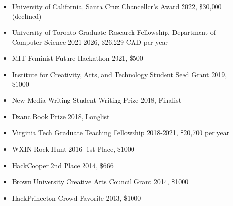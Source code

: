 \begin{itemize}
\item University of California, Santa Cruz Chancellor's Award 2022, \$30,000 (declined) 

\item University of Toronto Graduate Research Fellowship, Department of Computer Science 2021-2026, \$26,229 CAD per year 

\item MIT Feminist Future Hackathon 2021, \$500 
 
\item  Institute for Creativity, Arts, and Technology Student Seed Grant 2019, \$1000  

\item New Media Writing Student Writing Prize 2018, Finalist

\item Dzanc Book Prize 2018, Longlist 

\item Virginia Tech Graduate Teaching Fellowship 2018-2021, \$20,700 per year 

\item WXIN Rock Hunt 2016, 1st Place, \$1000  

\item HackCooper 2nd Place 2014, \$666  

\item Brown University Creative Arts Council Grant 2014, \$1000 

\item HackPrinceton Crowd Favorite 2013, \$1000 


\end{itemize}














 


